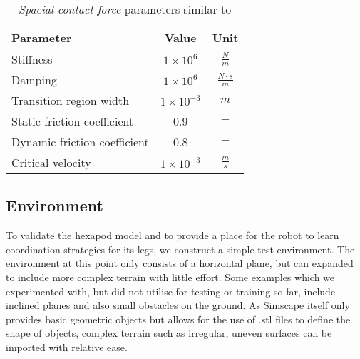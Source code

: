 \begin{table}
	\centering
	\begin{tabular}{| l | c | c |}
		\hline
		\textbf{Parameter} & \textbf{Value} & \textbf{Unit} \\ 
		\hline
		\hline
		Stiffness & $1 \times 10^6$ & $\frac{N}{m}$ \\
		
		Damping & $1 \times 10^6$ & $\frac{N\cdot s}{m}$ \\
		
		Transition region width & $1 \times 10^{-3}$ & $m$ \\
		
		Static friction coefficient &  0.9 & $-$ \\
		
		Dynamic friction coefficient &  0.8 & $-$ \\
		
		Critical velocity & $1 \times 10^{-3}$ & $\frac{m}{s}$ \\
		\hline
	\end{tabular}
	\caption{\textit{Spacial contact force} parameters similar to  \cite{trotta2022walking}}
	\label{table: Spatial contact force}
\end{table}



\subsection{Environment}
To validate the hexapod model and to provide a place for the robot to learn coordination strategies for its legs, we construct a simple test environment.
The environment at this point only consists of a horizontal plane, but can expanded to include more complex terrain with little effort.
Some examples which we experimented with, but did not utilise for testing or training so far, include inclined planes and also small obstacles on the ground.
As Simscape itself only provides basic geometric objects but allows for the use of .stl files to define the shape of objects, complex terrain such as irregular, uneven surfaces can be imported with relative ease.


